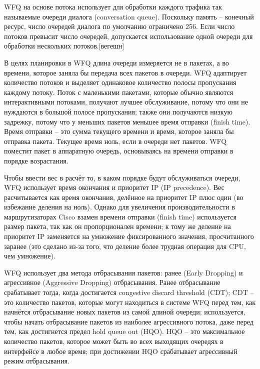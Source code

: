 
	WFQ на основе потока использует для обработки каждого трафика так называемые
	очереди диалога (conversation queue).
	Поскольку память -- конечный ресурс, число очередей диалога по умолчанию
	ограничено 256. Если число потоков превысит число очередей, допускается
	использование одной очереди для обработки нескольких потоков.[вегешн]

	В целях планировки в WFQ длина очереди измеряется не в пакетах, а во времени,
	которое заняла бы передача всех пакетов в очереди. WFQ адаптирует количество
	потоков и выделяет одинаковое количество полосы пропускания каждому потоку.
	Поток с маленькими пакетами, которые обычно являются интерактивными потоками,
	получают лучшее обслуживание, потому что они не нуждаются в большой полосе пропускания;
	также они получаются низкую задрежку, потому что у меньших пакетов меньшее
	время отправки (finish time). Время отправки -- это сумма текущего времени и
	время, которое заняла бы отправка пакета. Текущее время ноль, если в очереди
	нет пакетов. WFQ поместит пакет в аппаратную очередь, основываясь на времени отправки в
	порядке возрастания.

	Чтобы ввести вес в расчёт то, в каком порядке будут обслуживаться очереди,
	WFQ использует время окончания и приоритет IP (IP precedence). Вес расчитывается
	как время окончания, делённое на приоритет IP плюс один (во избежание деления
	на ноль). Однако для увеличения производительности в маршрутизаторах Cisco
	взамен времени отправки (finish time) используется размер пакета, так как он
	пропорционален времени; к тому же деление на приоритет IP заменяется на умножение
	фиксированного значения, просчитанного заранее (это сделано из-за того,
	что деление более трудная операция для CPU, чем умножение).

	WFQ использует два метода отбрасывания пакетов: ранее (Early Dropping) и агрессивное
	(Aggressive Dropping) отбрасывания. Ранее отбрасывание срабатывает тогда, когда
	достигается congestive discard threshold (CDT); CDT -- это количество пакетов, которые могут
	находиться в системе WFQ перед тем, как начнётся отбрасывание новых пакетов
	из самой длиной очереди; используется, чтобы начать отбрасывание пакетов
	из наиболее агрессивного потока, даже перед тем, как достигнется предел
	hold queue out (HQO). HQO -- это максимальное количество пакетов, которое может быть
	во всех выходящих очередях в интерфейсе в любое время; при достижении HQO
	срабатывает агрессивный режим отбрасывания.

